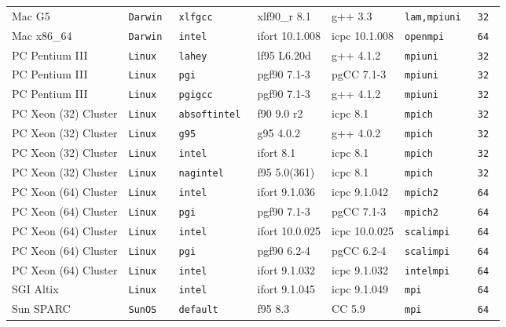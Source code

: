 \begin{tabular}{lllllll}
Mac G5          &\tt Darwin &\tt xlfgcc  & xlf90\_r \footnotesize 8.1& g++ \footnotesize 3.3    &\tt lam,mpiuni &\tt 32 \\
Mac x86_64      &\tt Darwin &\tt intel   & ifort \footnotesize 10.1.008 & icpc \footnotesize 10.1.008 &\tt openmpi &\tt 64 \\
PC Pentium III  &\tt Linux  &\tt lahey   & lf95 \footnotesize L6.20d & g++ \footnotesize 4.1.2  &\tt mpiuni     &\tt 32 \\
PC Pentium III  &\tt Linux  &\tt pgi     & pgf90 \footnotesize 7.1-3 & pgCC \footnotesize 7.1-3 &\tt mpiuni     &\tt 32 \\
PC Pentium III  &\tt Linux  &\tt pgigcc  & pgf90 \footnotesize 7.1-3 & g++ \footnotesize 4.1.2  &\tt mpiuni     &\tt 32 \\
PC Xeon (32) Cluster &\tt Linux  &\tt absoftintel & f90 \footnotesize 9.0 r2    & icpc \footnotesize 8.1      &\tt mpich     &\tt 32 \\
PC Xeon (32) Cluster &\tt Linux  &\tt g95         & g95 \footnotesize 4.0.2     & g++  \footnotesize 4.0.2    &\tt mpich     &\tt 32 \\
PC Xeon (32) Cluster &\tt Linux  &\tt intel       & ifort \footnotesize 8.1     & icpc \footnotesize 8.1      &\tt mpich     &\tt 32 \\
PC Xeon (32) Cluster &\tt Linux  &\tt nagintel    & f95 \footnotesize 5.0(361)  & icpc \footnotesize 8.1      &\tt mpich     &\tt 32 \\
PC Xeon (64) Cluster &\tt Linux  &\tt intel  & ifort \footnotesize 9.1.036  & icpc \footnotesize 9.1.042  &\tt mpich2    &\tt 64 \\
PC Xeon (64) Cluster &\tt Linux  &\tt pgi    & pgf90 \footnotesize 7.1-3    & pgCC \footnotesize 7.1-3    &\tt mpich2    &\tt 64 \\
PC Xeon (64) Cluster &\tt Linux  &\tt intel  & ifort \footnotesize 10.0.025 & icpc \footnotesize 10.0.025 &\tt scalimpi  &\tt 64 \\
PC Xeon (64) Cluster &\tt Linux  &\tt pgi    & pgf90 \footnotesize 6.2-4    & pgCC \footnotesize 6.2-4    &\tt scalimpi  &\tt 64 \\
PC Xeon (64) Cluster &\tt Linux  &\tt intel  & ifort \footnotesize 9.1.032  & icpc \footnotesize 9.1.032  &\tt intelmpi  &\tt 64 \\
SGI Altix      &\tt Linux  &\tt intel   & ifort \footnotesize 9.1.045 & icpc \footnotesize 9.1.049 &\tt mpi    &\tt 64 \\
Sun SPARC      &\tt SunOS  &\tt default   & f95 \footnotesize 8.3 & CC \footnotesize 5.9 &\tt mpi    &\tt 64 \\
\end{tabular}

